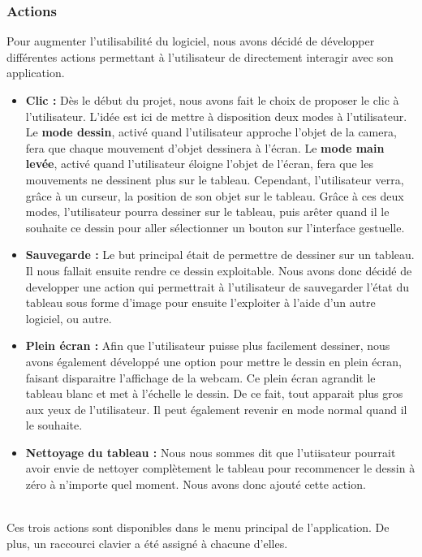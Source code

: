 \documentclass{report}
\begin{document}
			\subsubsection{Actions}
				Pour augmenter l'utilisabilité du logiciel, nous avons décidé de développer différentes actions permettant à l'utilisateur de directement interagir avec son application. \\
				\begin{itemize}
					\item \textbf{Clic :} Dès le début du projet, nous avons fait le choix de proposer le clic à l'utilisateur. L'idée est ici de mettre à disposition deux modes à l'utilisateur. Le \textbf{mode dessin}, activé quand l'utilisateur approche l'objet de la camera, fera que chaque mouvement d'objet dessinera à l'écran. Le \textbf{mode main levée}, activé quand l'utilisateur éloigne l'objet de l'écran, fera que les mouvements ne dessinent plus sur le tableau. Cependant, l'utilisateur verra, grâce à un curseur, la position de son objet sur le tableau. Grâce à ces deux modes, l'utilisateur pourra dessiner sur le tableau, puis arêter quand il le souhaite ce dessin pour aller sélectionner un bouton sur l'interface gestuelle.
					\item \textbf{Sauvegarde : } Le but principal était de permettre de dessiner sur un tableau. Il nous fallait ensuite rendre ce dessin exploitable. Nous avons donc décidé de developper une action qui permettrait à l'utilisateur de sauvegarder l'état du tableau sous forme d'image pour ensuite l'exploiter à l'aide d'un autre logiciel, ou autre.
					\item \textbf{Plein écran : } Afin que l'utilisateur puisse plus facilement dessiner, nous avons également développé une option pour mettre le dessin en plein écran, faisant disparaitre l'affichage de la webcam. Ce plein écran agrandit le tableau blanc et met à l'échelle le dessin. De ce fait, tout apparait plus gros aux yeux de l'utilisateur. Il peut également revenir en mode normal quand il le souhaite.
					
					\item \textbf{Nettoyage du tableau :} Nous nous sommes dit que l'utiisateur pourrait avoir envie de nettoyer complètement le tableau pour recommencer le dessin à zéro à n'importe quel moment. Nous avons donc ajouté cette action.
				\end{itemize}
				
				\ \\Ces trois actions sont disponibles dans le menu principal de l'application. De plus, un raccourci clavier a été assigné à chacune d'elles. \\
\end{document}
